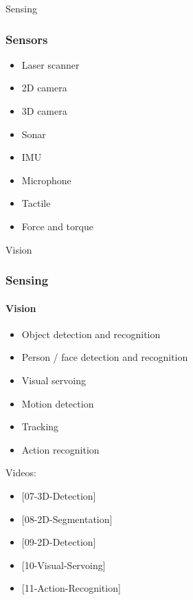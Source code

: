 \documentclass{beamer}
\begin{document}
\begin{frame}[standout]
     Sensing
\end{frame}

\begin{frame}
\frametitle{Sensors}
\begin{itemize}
    \item Laser scanner
    \item 2D camera
    \item 3D camera
    \item Sonar
    \item IMU
    \item Microphone
    \item Tactile
    \item Force and torque
\end{itemize}
\end{frame}

\begin{frame}[standout]
     Vision
\end{frame}
\begin{frame}
\frametitle{Sensing}
\framesubtitle{Vision}
\begin{itemize}
    \item <1->Object detection and recognition
    \item <2->Person / face detection and recognition
    \item <3->Visual servoing
    \item <4->Motion detection
    \item <5->Tracking
    \item <6->Action recognition
\end{itemize}

{\footnotesize
Videos:
\begin{itemize}
\item <1->{[07-3D-Detection]}
\item <1->{[08-2D-Segmentation]}
\item <1->{[09-2D-Detection]}
\item <3->{[10-Visual-Servoing]}
\item <6->{[11-Action-Recognition]}
\end{itemize}}
\end{frame}
\end{document}

